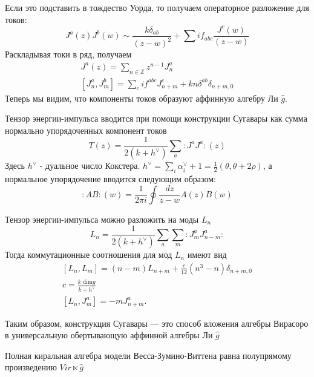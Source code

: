 Если это подставить в тождество Уорда, то получаем операторное разложение для токов:
\begin{equation}
  \label{eq:89}
  J^a(z) J^b(w) \sim \frac{k\delta_{ab}}{(z-w)^2}+\sum i f_{abc}\frac{J^c(w)}{(z-w)}
\end{equation}
Раскладывая токи в ряд, получаем
\begin{equation}
  \label{eq:90}
  \begin{aligned}
    J^a(z)=\sum_{n\in \mathbb Z}z^{n-1}J^a_n\\
    \left[J^a_n,J^b_m\right]=\sum_c i f^{abc}J^c_{n+m}+kn\delta^{ab}\delta_{n+m,0}
  \end{aligned}
\end{equation}
Теперь мы видим, что компоненты токов образуют аффинную алгебру Ли $\hat g$.


Тензор энергии-импульса вводится при помощи конструкции Сугавары как сумма нормально упорядоченных компонент токов
\begin{equation}
  \label{eq:102}
  T(z)=\frac{1}{2(k+h^{\vee})}\sum_a :J^a J^a:(z)
\end{equation}
Здесь $h^{\vee}$ - дуальное число Кокстера. $h^{\vee}=\sum_i \alpha_i^{\vee} +1=\frac{1}{2}(\theta,\theta+2\rho)$,
а нормальное упорядочение вводится следующим образом: 
\begin{equation}
  \label{eq:12}
  :AB:(w)=\frac{1}{2\pi i}\oint\frac{dz}{z-w}A(z)B(w)
\end{equation}

Тензор энергии-импульса можно разложить на моды $L_n$
\begin{equation}
  \label{eq:91}
  L_n=\frac{1}{2(k+h^{\vee})}\sum_a\sum_m:J^a_m J^a_{n-m}:
\end{equation}
Тогда коммутационные соотношения для мод $L_n$ имеют вид
\begin{equation}
  \label{eq:92}
  \begin{aligned}
    \left[L_n,L_m\right]=(n-m)L_{n+m}+\frac{c}{12}(n^3-n)\delta_{n+m,0}\\
    c=\frac{k\;\mathrm{dim}g}{k+h^{\vee}}\\
    \left[L_n,J^a_m\right]=-mJ^a_{n+m}.
  \end{aligned}
\end{equation}

Таким образом, конструкция Сугавары --- это способ вложения алгебры Вирасоро в универсальную обертывающую аффинной алгебры Ли $\hat{g}$

Полная киральная алгебра модели Весса-Зумино-Виттена равна полупрямому произведению $Vir\ltimes \hat g$

